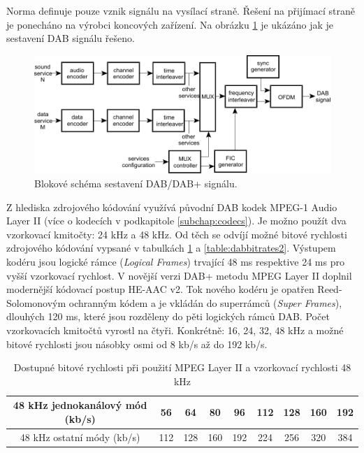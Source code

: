 Norma \cite{etsi:dab} definuje pouze vznik signálu na vysílací straně. Řešení na přijímací straně je ponecháno na výrobci koncových zařízení. Na obrázku \ref{pic:dab} je ukázáno jak je sestavení DAB signálu řešeno.

\begin{figure}[h]
    \centering
    \includegraphics[width=.9\textwidth]{pic/dab.pdf}
    \caption{Blokové schéma sestavení DAB/DAB+ signálu.\cite{etsi:dab}}
    \label{pic:dab}
\end{figure}

Z hlediska zdrojového kódování využívá původní DAB kodek MPEG-1 Audio Layer II (více o kodecích v podkapitole \ref{subchap:codecs}). Je možno použít dva vzorkovací kmitočty: 24 kHz a 48 kHz. Od těch se odvíjí možné bitové rychlosti zdrojového kódování vypsané v tabulkách \ref{table:dabbitrates1} a \ref{table:dabbitrates2}. Výstupem kodéru jsou logické rámce (\textit{Logical Frames}) trvající 48 ms respektive 24 ms pro vyšší vzorkovací rychlost.
V novější verzi DAB+ metodu MPEG Layer II doplnil modernější  kódovací postup HE-AAC v2. Tok nového kodéru je opatřen Reed-Solomonovým ochranným kódem a je vkládán do superrámců (\textit{Super Frames}), dlouhých 120 ms, které jsou rozděleny do pěti logických rámců DAB. Počet vzorkovacích kmitočtů vyrostl na čtyři. Konkrétně: 16, 24, 32, 48 kHz a možné bitové rychlosti jsou násobky osmi od 8 kb/s až do 192 kb/s.

\begin{table}[h]
\centering
\begin{tabular}{|c|c|c|c|c|c|c|c|c|}
\hline
48 kHz jednokanálový mód (kb/s) & 56 & 64 & 80 & 96 & 112 & 128 & 160 & 192 \\ \hline
48 kHz ostatní módy (kb/s) & 112 & 128 & 160 & 192 & 224 & 256 & 320 & 384 \\ \hline
\end{tabular}
\caption{Dostupné bitové rychlosti při použití MPEG Layer II a vzorkovací rychlosti 48 kHz \cite{etsi:mp2}}
\label{table:dabbitrates1}
\end{table}

